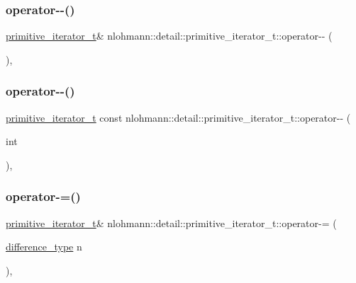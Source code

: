 \subsubsection{\texorpdfstring{operator-\/-\/()}{operator--()}\hspace{0.1cm}{\footnotesize\ttfamily [1/2]}}
{\footnotesize\ttfamily \mbox{\hyperlink{classnlohmann_1_1detail_1_1primitive__iterator__t}{primitive\+\_\+iterator\+\_\+t}}\& nlohmann\+::detail\+::primitive\+\_\+iterator\+\_\+t\+::operator-\/-\/ (\begin{DoxyParamCaption}{ }\end{DoxyParamCaption})\hspace{0.3cm}{\ttfamily [inline]}, {\ttfamily [noexcept]}}

\mbox{\label{classnlohmann_1_1detail_1_1primitive__iterator__t_aef3b5dfeb2cb04dc9d0a024fc1898b98}} 
\subsubsection{\texorpdfstring{operator-\/-\/()}{operator--()}\hspace{0.1cm}{\footnotesize\ttfamily [2/2]}}
{\footnotesize\ttfamily \mbox{\hyperlink{classnlohmann_1_1detail_1_1primitive__iterator__t}{primitive\+\_\+iterator\+\_\+t}} const nlohmann\+::detail\+::primitive\+\_\+iterator\+\_\+t\+::operator-\/-\/ (\begin{DoxyParamCaption}\item[{int}]{ }\end{DoxyParamCaption})\hspace{0.3cm}{\ttfamily [inline]}, {\ttfamily [noexcept]}}

\mbox{\label{classnlohmann_1_1detail_1_1primitive__iterator__t_a0bf83ab08abe1ae4b51c790c85cdf151}} 
\subsubsection{\texorpdfstring{operator-\/=()}{operator-=()}}
{\footnotesize\ttfamily \mbox{\hyperlink{classnlohmann_1_1detail_1_1primitive__iterator__t}{primitive\+\_\+iterator\+\_\+t}}\& nlohmann\+::detail\+::primitive\+\_\+iterator\+\_\+t\+::operator-\/= (\begin{DoxyParamCaption}\item[{\mbox{\hyperlink{classnlohmann_1_1detail_1_1primitive__iterator__t_af3db0d5c90de427d51645fe73a015553}{difference\+\_\+type}}}]{n }\end{DoxyParamCaption})\hspace{0.3cm}{\ttfamily [inline]}, {\ttfamily [noexcept]}}

